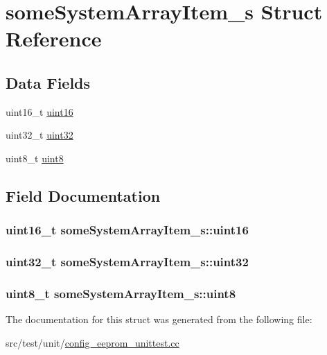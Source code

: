 \hypertarget{structsomeSystemArrayItem__s}{\section{some\+System\+Array\+Item\+\_\+s Struct Reference}
\label{structsomeSystemArrayItem__s}
}
\subsection*{Data Fields}
\begin{DoxyCompactItemize}
\item 
uint16\+\_\+t \hyperlink{structsomeSystemArrayItem__s_a9c154c5bc0e2b5fce20fc8ff491e01f9}{uint16}
\item 
uint32\+\_\+t \hyperlink{structsomeSystemArrayItem__s_a72becb64ea99a1bd858b5c2753bf37f2}{uint32}
\item 
uint8\+\_\+t \hyperlink{structsomeSystemArrayItem__s_a1204e3fe34aacbbcc0c6559e6b3c6644}{uint8}
\end{DoxyCompactItemize}


\subsection{Field Documentation}
\hypertarget{structsomeSystemArrayItem__s_a9c154c5bc0e2b5fce20fc8ff491e01f9}{
\subsubsection[{uint16}]{\setlength{\rightskip}{0pt plus 5cm}uint16\+\_\+t some\+System\+Array\+Item\+\_\+s\+::uint16}}\label{structsomeSystemArrayItem__s_a9c154c5bc0e2b5fce20fc8ff491e01f9}
\hypertarget{structsomeSystemArrayItem__s_a72becb64ea99a1bd858b5c2753bf37f2}{
\subsubsection[{uint32}]{\setlength{\rightskip}{0pt plus 5cm}uint32\+\_\+t some\+System\+Array\+Item\+\_\+s\+::uint32}}\label{structsomeSystemArrayItem__s_a72becb64ea99a1bd858b5c2753bf37f2}
\hypertarget{structsomeSystemArrayItem__s_a1204e3fe34aacbbcc0c6559e6b3c6644}{
\subsubsection[{uint8}]{\setlength{\rightskip}{0pt plus 5cm}uint8\+\_\+t some\+System\+Array\+Item\+\_\+s\+::uint8}}\label{structsomeSystemArrayItem__s_a1204e3fe34aacbbcc0c6559e6b3c6644}


The documentation for this struct was generated from the following file\+:\begin{DoxyCompactItemize}
\item 
src/test/unit/\hyperlink{config__eeprom__unittest_8cc}{config\+\_\+eeprom\+\_\+unittest.\+cc}\end{DoxyCompactItemize}
